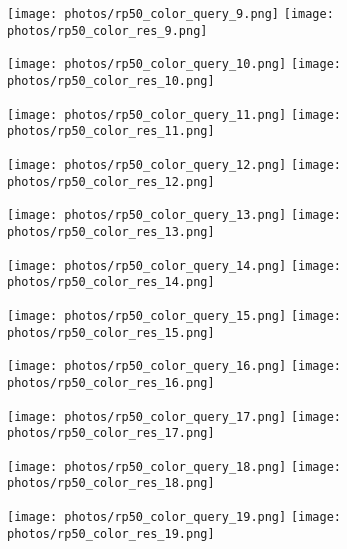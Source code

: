 \documentclass{article}
\begin{document}
\begin{figure}[!ht]
\centering
\texttt{[image: photos/rp50\_color\_query\_9.png]}
\texttt{[image: photos/rp50\_color\_res\_9.png]}
\end{figure}

\begin{figure}[!ht]
\centering
\texttt{[image: photos/rp50\_color\_query\_10.png]}
\texttt{[image: photos/rp50\_color\_res\_10.png]}
\end{figure}

\begin{figure}[!ht]
\centering
\texttt{[image: photos/rp50\_color\_query\_11.png]}
\texttt{[image: photos/rp50\_color\_res\_11.png]}
\end{figure}

\begin{figure}[!ht]
\centering
\texttt{[image: photos/rp50\_color\_query\_12.png]}
\texttt{[image: photos/rp50\_color\_res\_12.png]}
\end{figure}

\begin{figure}[!ht]
\centering
\texttt{[image: photos/rp50\_color\_query\_13.png]}
\texttt{[image: photos/rp50\_color\_res\_13.png]}
\end{figure}

\begin{figure}[!ht]
\centering
\texttt{[image: photos/rp50\_color\_query\_14.png]}
\texttt{[image: photos/rp50\_color\_res\_14.png]}
\end{figure}

\begin{figure}[!ht]
\centering
\texttt{[image: photos/rp50\_color\_query\_15.png]}
\texttt{[image: photos/rp50\_color\_res\_15.png]}
\end{figure}

\begin{figure}[!ht]
\centering
\texttt{[image: photos/rp50\_color\_query\_16.png]}
\texttt{[image: photos/rp50\_color\_res\_16.png]}
\end{figure}

\begin{figure}[!ht]
\centering
\texttt{[image: photos/rp50\_color\_query\_17.png]}
\texttt{[image: photos/rp50\_color\_res\_17.png]}
\end{figure}

\begin{figure}[!ht]
\centering
\texttt{[image: photos/rp50\_color\_query\_18.png]}
\texttt{[image: photos/rp50\_color\_res\_18.png]}
\end{figure}

\begin{figure}[!ht]
\centering
\texttt{[image: photos/rp50\_color\_query\_19.png]}
\texttt{[image: photos/rp50\_color\_res\_19.png]}
\end{figure}
\end{document}

